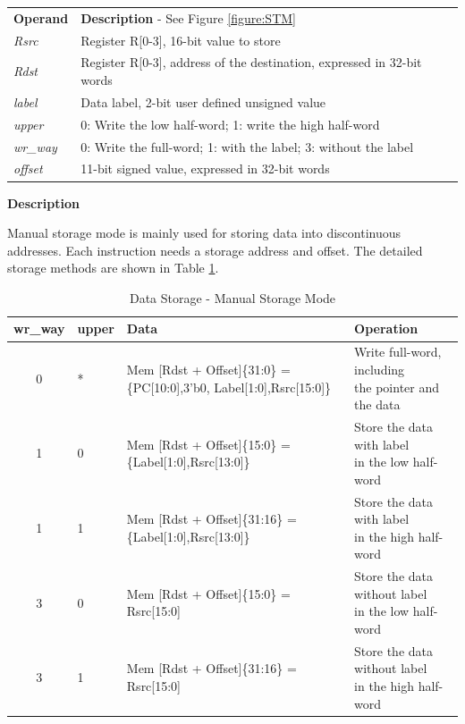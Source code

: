 \documentclass[main\_\_EN.tex]{subfiles}
\begin{document}
\begin{tabular}{ l l }
\textbf{Operand} & \textbf{Description} - See Figure \ref{figure:STM} \\
\textit{Rsrc} & Register R[0-3], 16-bit value to store\\
\textit{Rdst} & Register R[0-3], address of the destination, expressed in 32-bit words\\
\textit{label} & Data label, 2-bit user defined unsigned value\\
\textit{upper} & 0: Write the low half-word; 1: write the high half-word\\
\textit{wr\_way} & 0: Write the full-word; 1: with the label; 3: without the label\\
\textit{offset} & 11-bit signed value, expressed in 32-bit words
\end{tabular}

\textbf{Description}

Manual storage mode is mainly used for storing data into discontinuous addresses. Each instruction needs a storage address and offset. The detailed storage methods are shown in Table  \ref{table:data_format-with-write_way}. \\

\begin{table}[!ht ]
    \centering
    \begin{tabular}{ c l l l }
    \textbf{wr\_way}  & \textbf{upper} & \textbf{Data} & \textbf{Operation}  \\ \hline
    0 &*&Mem [Rdst + Offset]\{31:0\} = \{PC[10:0],3'b0, Label[1:0],Rsrc[15:0]\}  & \makecell[tl]{Write full-word, including  \\ the pointer and the data} \\
    1 & 0 & Mem [Rdst + Offset]\{15:0\} =  \{Label[1:0],Rsrc[13:0]\}& \makecell[tl]{Store the data with label  \\ in the low half-word}\\
    1 & 1 & Mem [Rdst + Offset]\{31:16\} = \{Label[1:0],Rsrc[13:0]\} & \makecell[tl]{Store the data with label  \\ in the high half-word}\\
    3 & 0 & Mem [Rdst + Offset]\{15:0\} = Rsrc[15:0]& \makecell[tl]{Store the data without label  \\ in the low half-word}  \\
    3 & 1 & Mem [Rdst + Offset]\{31:16\} = Rsrc[15:0]& \makecell[tl]{Store the data without label  \\ in the high half-word}  \\
    \end{tabular}
    \caption{Data Storage - Manual Storage Mode}
    \label{table:data_format-with-write_way}
\end{table}
\end{document}
